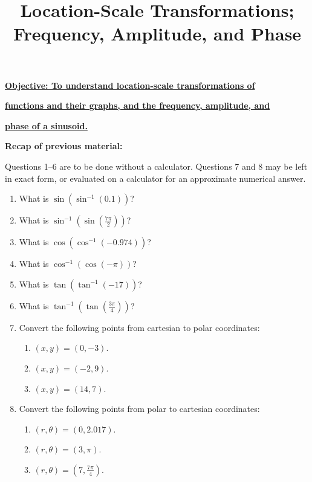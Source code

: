\documentclass{article}
\begin{document}
\title{Location-Scale Transformations; Frequency, Amplitude, and Phase}
\date{}

\maketitle
\thispagestyle{empty}

\Large

{\bf \underline{Objective: To understand location-scale transformations of}}

\textbf{\underline{functions and their graphs, and the frequency, amplitude, and}}

\textbf{\underline{phase of a sinusoid.}}

\vspace{5mm}


{\bf Recap of previous material:}

\vspace{5mm}

Questions 1--6 are to be done without a calculator. Questions 7 and 8 may be left in exact form, or evaluated on a calculator for an approximate numerical answer.

\begin{enumerate}
\item What is $\sin(\sin^{-1}(0.1))$?
\item What is $\sin^{-1}\left(\sin\left(\frac{7\pi}{2}\right)\right)$?
\item What is $\cos(\cos^{-1}(-0.974))$?
\item What is $\cos^{-1}(\cos(-\pi))$?
\item What is $\tan(\tan^{-1}(-17))$?
\item What is $\tan^{-1}\left(\tan\left(\frac{3\pi}{4}\right)\right)$?
\item Convert the following points from cartesian to polar coordinates:
	\begin{enumerate}
	\item $(x,y)=(0,-3)$.
	\item $(x,y)=(-2,9)$.
	\item $(x,y)=(14,7)$.
	\end{enumerate}
\item Convert the following points from polar to cartesian coordinates:
	\begin{enumerate}
	\item $(r,\theta)=(0,2.017)$.
	\item $(r,\theta)=(3,\pi)$.
	\item $(r,\theta)=\left(7,\frac{7\pi}{4}\right)$.
	\end{enumerate}
\end{enumerate}
\end{document}
